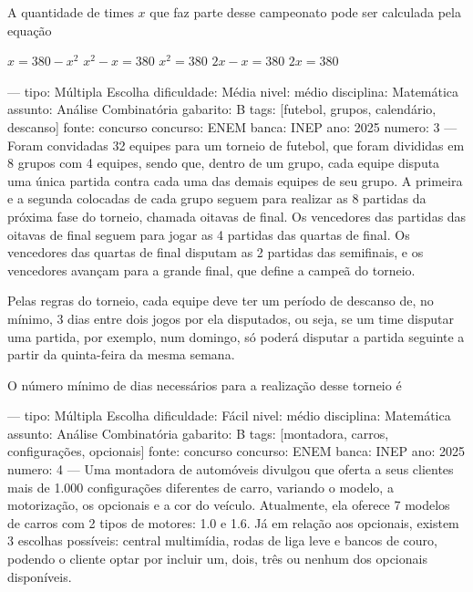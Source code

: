 A quantidade de times \( x \) que faz parte desse campeonato pode ser calculada pela equação
\begin{oneparchoices}
\choice \( x = 380 - x^2 \)
\correctchoice \( x^2 - x = 380 \)
\choice \( x^2 = 380 \)
\choice \( 2x - x = 380 \)
\choice \( 2x = 380 \)
\end{oneparchoices}

---
tipo: Múltipla Escolha
dificuldade: Média
nivel: médio
disciplina: Matemática
assunto: Análise Combinatória
gabarito: B
tags: [futebol, grupos, calendário, descanso]
fonte: concurso
concurso: ENEM
banca: INEP
ano: 2025
numero: 3
---
\question
Foram convidadas 32 equipes para um torneio de futebol, que foram divididas em 8 grupos com 4 equipes, sendo que, dentro de um grupo, cada equipe disputa uma única partida contra cada uma das demais equipes de seu grupo. A primeira e a segunda colocadas de cada grupo seguem para realizar as 8 partidas da próxima fase do torneio, chamada oitavas de final. Os vencedores das partidas das oitavas de final seguem para jogar as 4 partidas das quartas de final. Os vencedores das quartas de final disputam as 2 partidas das semifinais, e os vencedores avançam para a grande final, que define a campeã do torneio.

Pelas regras do torneio, cada equipe deve ter um período de descanso de, no mínimo, 3 dias entre dois jogos por ela disputados, ou seja, se um time disputar uma partida, por exemplo, num domingo, só poderá disputar a partida seguinte a partir da quinta-feira da mesma semana.

O número mínimo de dias necessários para a realização desse torneio é
\begin{oneparchoices}
\end{oneparchoices}

---
tipo: Múltipla Escolha
dificuldade: Fácil
nivel: médio
disciplina: Matemática
assunto: Análise Combinatória
gabarito: B
tags: [montadora, carros, configurações, opcionais]
fonte: concurso
concurso: ENEM
banca: INEP
ano: 2025
numero: 4
---
\question
Uma montadora de automóveis divulgou que oferta a seus clientes mais de 1.000 configurações diferentes de carro, variando o modelo, a motorização, os opcionais e a cor do veículo. Atualmente, ela oferece 7 modelos de carros com 2 tipos de motores: 1.0 e 1.6. Já em relação aos opcionais, existem 3 escolhas possíveis: central multimídia, rodas de liga leve e bancos de couro, podendo o cliente optar por incluir um, dois, três ou nenhum dos opcionais disponíveis.

